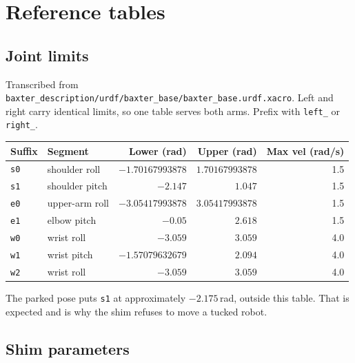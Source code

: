 \chapter{Reference tables}
\label{app:tables}

\section{Joint limits}

Transcribed from \texttt{baxter\_description/urdf/baxter\_base/baxter\_base.urdf.xacro}.
Left and right carry identical limits, so one table serves both arms. Prefix with
\texttt{left\_} or \texttt{right\_}.

\begin{table}[h]
\centering
\small
\begin{tabular}{@{}llrrr@{}}
\toprule
\textbf{Suffix} & \textbf{Segment} & \textbf{Lower (rad)} & \textbf{Upper (rad)} & \textbf{Max vel (rad/s)} \\
\midrule
\texttt{s0} & shoulder roll   & $-1.70167993878$ & $1.70167993878$ & 1.5 \\
\texttt{s1} & shoulder pitch  & $-2.147$         & $1.047$         & 1.5 \\
\texttt{e0} & upper-arm roll  & $-3.05417993878$ & $3.05417993878$ & 1.5 \\
\texttt{e1} & elbow pitch     & $-0.05$          & $2.618$         & 1.5 \\
\texttt{w0} & wrist roll      & $-3.059$         & $3.059$         & 4.0 \\
\texttt{w1} & wrist pitch     & $-1.57079632679$ & $2.094$         & 4.0 \\
\texttt{w2} & wrist roll      & $-3.059$         & $3.059$         & 4.0 \\
\bottomrule
\end{tabular}
\end{table}

The parked pose puts \texttt{s1} at approximately $-2.175$\,rad, outside this
table. That is expected and is why the shim refuses to move a tucked robot.

\section{Shim parameters}

